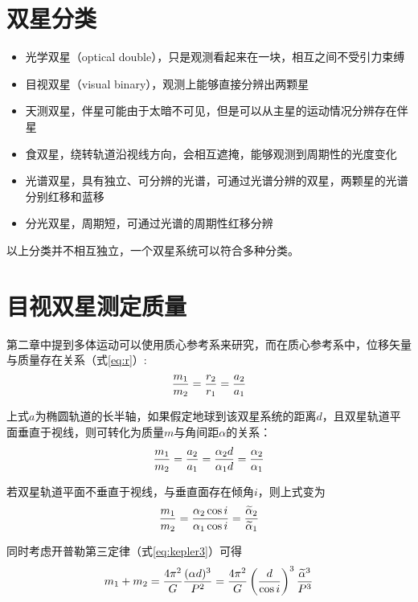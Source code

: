 \documentclass[openany]{ctexbook}
\begin{document}
\section{双星分类}
\begin{itemize}
  \item 光学双星（optical double），只是观测看起来在一块，相互之间不受引力束缚
  \item 目视双星（visual binary），观测上能够直接分辨出两颗星
  \item 天测双星，伴星可能由于太暗不可见，但是可以从主星的运动情况分辨存在伴星
  \item 食双星，绕转轨道沿视线方向，会相互遮掩，能够观测到周期性的光度变化
  \item 光谱双星，具有独立、可分辨的光谱，可通过光谱分辨的双星，两颗星的光谱分别红移和蓝移
  \item 分光双星，周期短，可通过光谱的周期性红移分辨
\end{itemize}

以上分类并不相互独立，一个双星系统可以符合多种分类。

\section{目视双星测定质量}
第二章中提到多体运动可以使用质心参考系来研究，而在质心参考系中，位移矢量与质量存在关系（式\ref{eq:r}）:
\begin{equation}
  {m_1\over m_2}={r_2\over r_1}={a_2\over a_1}
\end{equation}

上式$a$为椭圆轨道的长半轴，如果假定地球到该双星系统的距离$d$，且双星轨道平面垂直于视线，则可转化为质量$m$与角间距$\alpha$的关系：
\begin{equation}
  {m_1\over m_2}={a_2\over a_1}={\alpha_2 d\over \alpha_1 d}={\alpha_2\over \alpha_1}
\end{equation}

若双星轨道平面不垂直于视线，与垂直面存在倾角$i$，则上式变为
\begin{equation}
  {m_1\over m_2}={\alpha_2 \cos{i}\over \alpha_1\cos{i}}={\widetilde \alpha_2 \over \widetilde \alpha_1}
  \label{eq:binary1}
\end{equation}

同时考虑开普勒第三定律（式\ref{eq:kepler3}）可得
\begin{equation}
  m_1+m_2={4\pi^2 \over G}{(\alpha d)^3 \over P^2}={4\pi^2\over G}\left({d\over \cos i}\right)^3{\widetilde \alpha^3\over P^3}
  \label{eq:binary2}
\end{equation}
\end{document}
